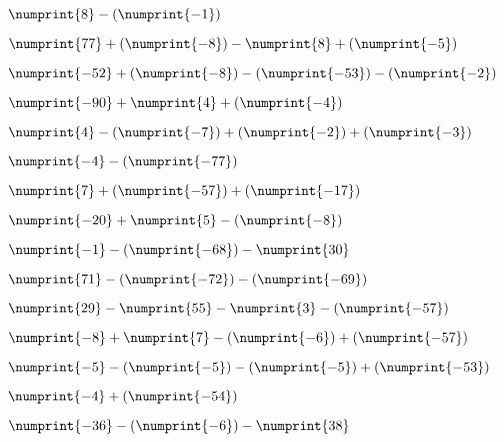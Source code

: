 {{\item$\numprint{8} - (\numprint{-1})$  \item$\numprint{77} + (\numprint{-8}) - \numprint{8} + (\numprint{-5})$  \item$\numprint{-52} + (\numprint{-8}) - (\numprint{-53}) - (\numprint{-2})$

\item$\numprint{-90} + \numprint{4} + (\numprint{-4})$  \item$\numprint{4} - (\numprint{-7}) + (\numprint{-2}) + (\numprint{-3})$  \item$\numprint{-4} - (\numprint{-77})$

\item$\numprint{7} + (\numprint{-57}) + (\numprint{-17})$  \item$\numprint{-20} + \numprint{5} - (\numprint{-8})$  \item$\numprint{-1} - (\numprint{-68}) - \numprint{30}$

\item$\numprint{71} - (\numprint{-72}) - (\numprint{-69})$  \item$\numprint{29} - \numprint{55} - \numprint{3} - (\numprint{-57})$  \item$\numprint{-8} + \numprint{7} - (\numprint{-6}) + (\numprint{-57})$

\item$\numprint{-5} - (\numprint{-5}) - (\numprint{-5}) + (\numprint{-53})$  \item$\numprint{-4} + (\numprint{-54})$  \item$\numprint{-36} - (\numprint{-6}) - \numprint{38}$

}}

\newpage

